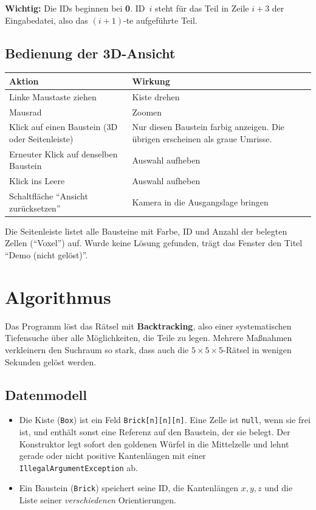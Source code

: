 \documentclass[11pt,a4paper,parskip=half]{scrartcl}
\newcommand{\code}[1]{\texttt{#1}}
\begin{document}
\textbf{Wichtig:} Die IDs beginnen bei \textbf{0}. ID~$i$ steht für das Teil in
Zeile $i+3$ der Eingabedatei, also das $(i+1)$-te aufgeführte Teil.

\subsection{Bedienung der 3D-Ansicht}

\begin{center}
\begin{tabularx}{\textwidth}{@{}lX@{}}
\toprule
\textbf{Aktion} & \textbf{Wirkung} \\
\midrule
Linke Maustaste ziehen & Kiste drehen \\
Mausrad & Zoomen \\
Klick auf einen Baustein (3D oder Seitenleiste) & Nur diesen Baustein farbig anzeigen. Die übrigen erscheinen als graue Umrisse. \\
Erneuter Klick auf denselben Baustein & Auswahl aufheben \\
Klick ins Leere & Auswahl aufheben \\
Schaltfläche \enquote{Ansicht zurücksetzen} & Kamera in die Ausgangslage bringen \\
\bottomrule
\end{tabularx}
\end{center}

Die Seitenleiste listet alle Bausteine mit Farbe, ID und Anzahl der belegten Zellen
(\enquote{Voxel}) auf. Wurde keine Lösung gefunden, trägt das Fenster den Titel
\enquote{Demo (nicht gelöst)}.

\section{Algorithmus}

Das Programm löst das Rätsel mit \textbf{Backtracking}, also einer systematischen
Tiefensuche über alle Möglichkeiten, die Teile zu legen. Mehrere Maßnahmen verkleinern
den Suchraum so stark, dass auch die $5\times5\times5$-Rätsel in wenigen Sekunden
gelöst werden.

\subsection{Datenmodell}

\begin{itemize}
  \item Die Kiste (\code{Box}) ist ein Feld \code{Brick[n][n][n]}. Eine Zelle ist
        \code{null}, wenn sie frei ist, und enthält sonst eine Referenz auf den
        Baustein, der sie belegt. Der Konstruktor legt sofort den goldenen Würfel in
        die Mittelzelle und lehnt gerade oder nicht positive Kantenlängen mit einer
        \code{IllegalArgumentException} ab.
  \item Ein Baustein (\code{Brick}) speichert seine ID, die Kantenlängen
        $x, y, z$ und die Liste seiner \emph{verschiedenen} Orientierungen.
\end{itemize}
\end{document}
